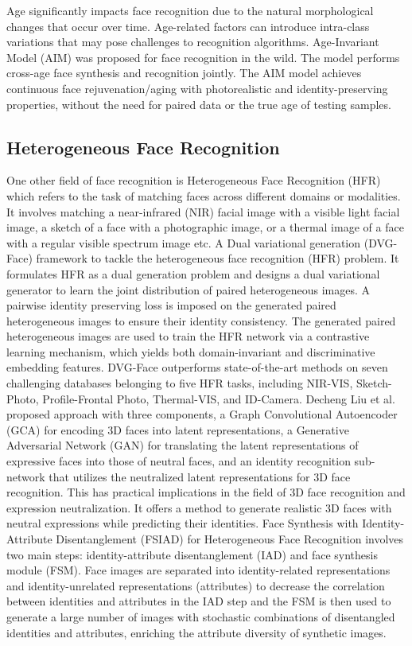 Age significantly impacts face recognition due to the natural morphological changes that occur over time. Age-related factors can introduce intra-class variations that may pose challenges to recognition algorithms. Age-Invariant Model (AIM) \cite{zhao_towards_2022} was proposed for face recognition in the wild. The model performs cross-age face synthesis and recognition jointly. The AIM model achieves continuous face rejuvenation/aging with photorealistic and identity-preserving properties, without the need for paired data or the true age of testing samples.

\subsection{Heterogeneous Face Recognition}

One other field of face recognition is Heterogeneous Face Recognition (HFR) which refers to the task of matching faces across different domains or modalities. It involves matching a near-infrared (NIR) facial image with a visible light facial image, a sketch of a face with a photographic image, or a thermal image of a face with a regular visible spectrum image etc. A Dual variational generation (DVG-Face) \cite{fu_dvg-face_2022} framework to tackle the heterogeneous face recognition (HFR) problem. It formulates HFR as a dual generation problem and designs a dual variational generator to learn the joint distribution of paired heterogeneous images. A pairwise identity preserving loss is imposed on the generated paired heterogeneous images to ensure their identity consistency. The generated paired heterogeneous images are used to train the HFR network via a contrastive learning mechanism, which yields both domain-invariant and discriminative embedding features. DVG-Face outperforms state-of-the-art methods on seven challenging databases belonging to five HFR tasks, including NIR-VIS, Sketch-Photo, Profile-Frontal Photo, Thermal-VIS, and ID-Camera.
Decheng Liu et al. \cite{liu_heterogeneous_2022} proposed approach with three components, a Graph Convolutional Autoencoder (GCA) for encoding 3D faces into latent representations, a Generative Adversarial Network (GAN) for translating the latent representations of expressive faces into those of neutral faces, and an identity recognition sub-network that utilizes the neutralized latent representations for 3D face recognition. This has practical implications in the field of 3D face recognition and expression neutralization. It offers a method to generate realistic 3D faces with neutral expressions while predicting their identities.
Face Synthesis with Identity-Attribute Disentanglement (FSIAD) \cite{yang_heterogeneous_2022} for Heterogeneous Face Recognition involves two main steps: identity-attribute disentanglement (IAD) and face synthesis module (FSM). Face images are separated into identity-related representations and identity-unrelated representations (attributes) to decrease the correlation between identities and attributes in the IAD step and the FSM is then used to generate a large number of images with stochastic combinations of disentangled identities and attributes, enriching the attribute diversity of synthetic images.
